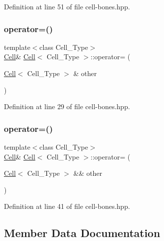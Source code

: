 Definition at line 51 of file cell-\/bones.\+hpp.

\mbox{\label{class_cell_acf4bbf136ed394887c35cfd4e78f50b9}} 
\subsubsection{\texorpdfstring{operator=()}{operator=()}\hspace{0.1cm}{\footnotesize\ttfamily [1/2]}}
{\footnotesize\ttfamily template$<$class Cell\+\_\+\+Type$>$ \\
\hyperlink{class_cell}{Cell}\& \hyperlink{class_cell}{Cell}$<$ Cell\+\_\+\+Type $>$\+::operator= (\begin{DoxyParamCaption}\item[{\hyperlink{class_cell}{Cell}$<$ Cell\+\_\+\+Type $>$ \&}]{other }\end{DoxyParamCaption})\hspace{0.3cm}{\ttfamily [inline]}}



Definition at line 29 of file cell-\/bones.\+hpp.

\mbox{\label{class_cell_a9bb18ace78fd9010b461c853ccc2c0f7}} 
\subsubsection{\texorpdfstring{operator=()}{operator=()}\hspace{0.1cm}{\footnotesize\ttfamily [2/2]}}
{\footnotesize\ttfamily template$<$class Cell\+\_\+\+Type$>$ \\
\hyperlink{class_cell}{Cell}\& \hyperlink{class_cell}{Cell}$<$ Cell\+\_\+\+Type $>$\+::operator= (\begin{DoxyParamCaption}\item[{\hyperlink{class_cell}{Cell}$<$ Cell\+\_\+\+Type $>$ \&\&}]{other }\end{DoxyParamCaption})\hspace{0.3cm}{\ttfamily [inline]}}



Definition at line 41 of file cell-\/bones.\+hpp.



\subsection{Member Data Documentation}
\mbox{\label{class_cell_a5df1609bc0705830ec4dc6e177ddc955}} 
